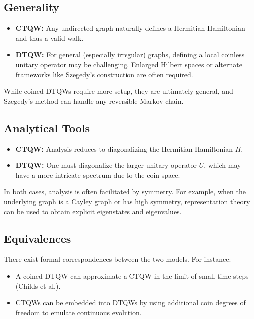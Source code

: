 \documentclass[12pt]{report}
\begin{document}
\subsection{Generality}

\begin{itemize}
    \item \textbf{CTQW:} Any undirected graph naturally defines a Hermitian Hamiltonian and thus a valid walk.
    \item \textbf{DTQW:} For general (especially irregular) graphs, defining a local coinless unitary operator may be challenging. Enlarged Hilbert spaces or alternate frameworks like Szegedy's construction are often required.
\end{itemize}

While coined DTQWs require more setup, they are ultimately general, and Szegedy's method can handle any reversible Markov chain.

\subsection{Analytical Tools}

\begin{itemize}
    \item \textbf{CTQW:} Analysis reduces to diagonalizing the Hermitian Hamiltonian $H$.
    \item \textbf{DTQW:} One must diagonalize the larger unitary operator $U$, which may have a more intricate spectrum due to the coin space.
\end{itemize}

In both cases, analysis is often facilitated by symmetry. For example, when the underlying graph is a Cayley graph or has high symmetry, representation theory can be used to obtain explicit eigenstates and eigenvalues.

\subsection{Equivalences}

There exist formal correspondences between the two models. For instance:
\begin{itemize}
    \item A coined DTQW can approximate a CTQW in the limit of small time-steps (Childs et al.).
    \item CTQWs can be embedded into DTQWs by using additional coin degrees of freedom to emulate continuous evolution.
\end{itemize}
\end{document}
